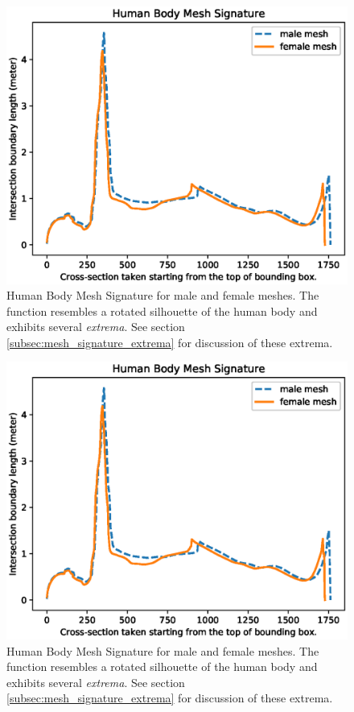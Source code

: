 \documentclass[runningheads]{llncs}
\begin{document}
\begin{figure}[H]
	\begin{center}
		\includegraphics[width=\linewidth]{Figure_1.eps}
	\end{center}
	\caption{Human Body Mesh Signature for male and female meshes. The 
		function resembles a rotated silhouette of the human body and exhibits 
		several \textit{extrema}. See section 
		\ref{subsec:mesh_signature_extrema} for discussion of these extrema.}
	\label{fig:qualitative_eval}
\end{figure}

\begin{figure}[H]
	\begin{center}
		\includegraphics[width=\linewidth]{Figure_1.eps}
	\end{center}
	\caption{Human Body Mesh Signature for male and female meshes. The 
		function resembles a rotated silhouette of the human body and exhibits 
		several \textit{extrema}. See section 
		\ref{subsec:mesh_signature_extrema} for discussion of these extrema.}
	\label{fig:qualitative_eval}
\end{figure}
\end{document}
